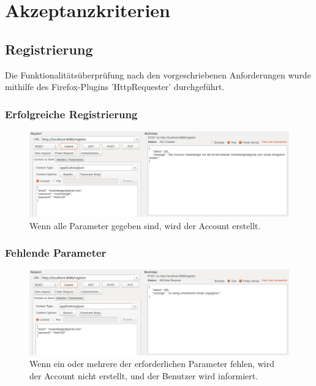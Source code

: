 \documentclass[letterpaper, 12pt]{article}
\let\tempsection\section
\renewcommand\section[1]{\vspace{-0.3cm}\tempsection{#1}\vspace{-0.3cm}}
\let\tempsubsection\subsection
\renewcommand\subsection[1]{\vspace{0cm}\tempsubsection{#1}\vspace{0cm}}
\let\tempsubsubsection\subsubsection
\renewcommand\subsubsection[1]{\vspace{0cm}\tempsubsubsection{#1}\vspace{0cm}}
\begin{document}
\section{Akzeptanzkriterien}
\subsection{Registrierung}
Die Funktionalitätsüberprüfung nach den vorgeschriebenen Anforderungen wurde mithilfe des Firefox-Plugins 'HttpRequester' durchgeführt. \cite{plugin}
\subsubsection{Erfolgreiche Registrierung}
\begin{figure}[h]
	\includegraphics[width=1\textwidth]{images/reg_erf}
	\caption{Wenn alle Parameter gegeben sind, wird der Account erstellt.}
\end{figure} 
\clearpage

\subsubsection{Fehlende Parameter}
\begin{figure}[h]
	\includegraphics[width=1\textwidth]{images/reg_less}
	\caption{Wenn ein oder mehrere der erforderlichen Parameter fehlen, wird der Account nicht erstellt, und der Benutzer wird informiert.}
\end{figure}
\end{document}
